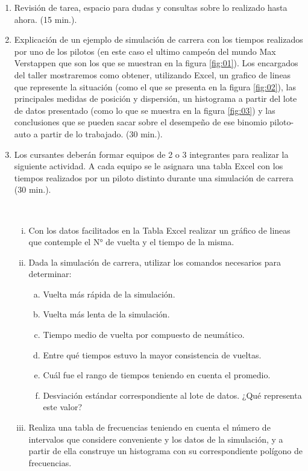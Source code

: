 \begin{enumerate}
	\item Revisión de tarea, espacio para dudas y consultas sobre lo realizado hasta ahora. (15 min.).
	
	\item Explicación de un ejemplo de simulación de carrera con los tiempos realizados por uno de los pilotos (en este caso el ultimo campeón del mundo Max Verstappen que son los que se muestran en la figura \ref{fig:01}). Los encargados del taller mostraremos como obtener, utilizando Excel, un grafico de lineas que represente la situación (como el que se presenta en la figura \ref{fig:02}), las principales medidas de posición y dispersión, un histograma a partir del lote de datos presentado (como lo que se muestra en la figura \ref{fig:03}) y las conclusiones que se pueden sacar sobre el desempeño de ese binomio piloto-auto a partir de lo trabajado. (30 min.).
	
	\item Los cursantes deberán formar equipos de 2 o 3 integrantes para realizar la siguiente actividad. A cada equipo se le asignara una tabla Excel con los tiempos realizados por un piloto distinto durante una simulación de carrera (30 min.).
	
	\begin{actividad}
		~
		\begin{enumerate}[i.]
			\item Con los datos facilitados en la Tabla Excel realizar un gráfico de lineas que contemple el N° de vuelta y el tiempo de la misma. 
			\item Dada la simulación de carrera, utilizar los comandos necesarios para determinar:
			\begin{enumerate}[a.]
				\item Vuelta más rápida de la simulación.
				\item Vuelta más lenta de la simulación.
				\item Tiempo medio de vuelta por compuesto de neumático.
				\item Entre qué tiempos estuvo la mayor consistencia de vueltas.
				\item Cuál fue el rango de tiempos teniendo en cuenta el promedio.
				\item Desviación estándar correspondiente al lote de datos. ¿Qué representa este valor?
			\end{enumerate}
			\item Realiza una tabla de frecuencias teniendo en cuenta el número de intervalos que considere conveniente y los datos de la simulación, y a partir de ella construye un histograma con su correspondiente polígono de frecuencias. 
		\end{enumerate}
	\end{actividad}
	

\end{enumerate}
